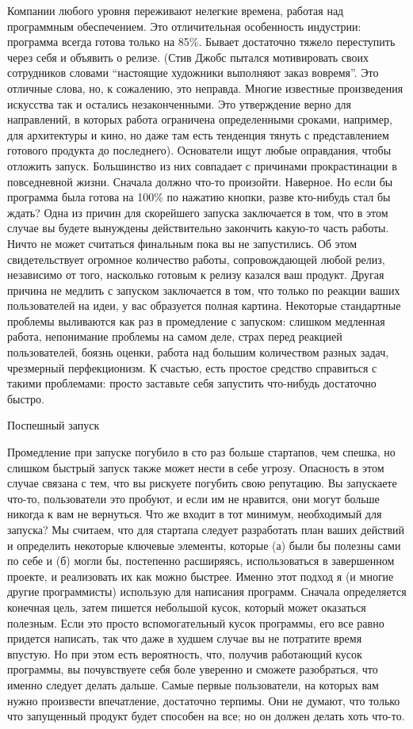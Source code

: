 \documentclass[ebook,12pt,oneside,openany]{memoir}
\begin{document}
Компании любого уровня переживают нелегкие времена, работая над
программным обеспечением. Это отличительная особенность индустрии:
программа всегда готова только на 85\%. Бывает достаточно тяжело
переступить через себя и объявить о релизе. (Стив Джобс пытался
мотивировать своих сотрудников словами “настоящие художники выполняют
заказ вовремя”. Это отличные слова, но, к сожалению, это неправда.
Многие известные произведения искусства так и остались незаконченными.
Это утверждение верно для направлений, в которых работа ограничена
определенными сроками, например, для архитектуры и кино, но даже там
есть тенденция тянуть с представлением готового продукта до
последнего). Основатели ищут любые оправдания, чтобы отложить запуск.
Большинство из них совпадает с причинами прокрастинации в повседневной
жизни. Сначала должно что-то произойти. Наверное. Но если бы программа
была готова на 100\% по нажатию кнопки, разве кто-нибудь стал бы
ждать? Одна из причин для скорейшего запуска заключается в том, что в
этом случае вы будете вынуждены действительно закончить какую-то часть
работы. Ничто не может считаться финальным пока вы не запустились. Об
этом свидетельствует огромное количество работы, сопровождающей любой
релиз, независимо от того, насколько готовым к релизу казался ваш
продукт. Другая причина не медлить с запуском заключается в том, что
только по реакции ваших пользователей на идеи, у вас образуется полная
картина. Некоторые стандартные проблемы выливаются как раз в
промедление с запуском: слишком медленная работа, непонимание проблемы
на самом деле, страх перед реакцией пользователей, боязнь оценки,
работа над большим количеством разных задач, чрезмерный перфекционизм.
К счастью, есть простое средство справиться с такими проблемами:
просто заставьте себя запустить что-нибудь достаточно быстро.

Поспешный запуск

Промедление при запуске погубило в сто раз больше стартапов, чем
спешка, но слишком быстрый запуск также может нести в себе угрозу.
Опасность в этом случае связана с тем, что вы рискуете погубить свою
репутацию. Вы запускаете что-то, пользователи это пробуют, и если им
не нравится, они могут больше никогда к вам не вернуться. Что же
входит в тот минимум, необходимый для запуска? Мы считаем, что для
стартапа следует разработать план ваших действий и определить
некоторые ключевые элементы, которые (а) были бы полезны сами по себе
и (б) могли бы, постепенно расширяясь, использоваться в завершенном
проекте, и реализовать их как можно быстрее. Именно этот подход я (и
многие другие программисты) использую для написания программ. Сначала
определяется конечная цель, затем пишется небольшой кусок, который
может оказаться полезным. Если это просто вспомогательный кусок
программы, его все равно придется написать, так что даже в худшем
случае вы не потратите время впустую. Но при этом есть вероятность,
что, получив работающий кусок программы, вы почувствуете себя боле
уверенно и сможете разобраться, что именно следует делать дальше.
Самые первые пользователи, на которых вам нужно произвести
впечатление, достаточно терпимы. Они не думают, что только что
запущенный продукт будет способен на все; но он должен делать хоть
что-то.
\end{document}
